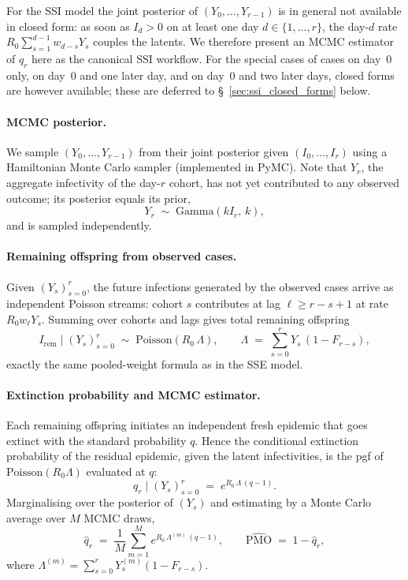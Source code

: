 \documentclass{article}
\theoremstyle{definition}
\begin{document}
For the SSI model the joint posterior of $(Y_0,\ldots,Y_{r-1})$ is in
general not available in closed form: as soon as $I_d > 0$ on at least
one day $d \in \{1, \ldots, r\}$, the day-$d$ rate
$R_0 \sum_{s=1}^{d-1} w_{d-s} Y_s$ couples the latents.  We therefore
present an MCMC estimator of $q_r$ here as the canonical SSI workflow.
For the special cases of cases on day~$0$ only, on day~$0$ and one
later day, and on day~$0$ and two later days, closed forms are however
available; these are deferred to \S~\ref{sec:ssi_closed_forms} below.

\paragraph{MCMC posterior.}

We sample $(Y_0,\ldots,Y_{r-1})$ from their joint posterior given
$(I_0,\ldots,I_r)$ using a Hamiltonian Monte Carlo sampler (implemented in
PyMC).  Note that $Y_r$, the aggregate infectivity of the day-$r$ cohort,
has not yet contributed to any observed outcome; its posterior equals its
prior,
\[
  Y_r \;\sim\; \mathrm{Gamma}(kI_r,\, k),
\]
and is sampled independently.

\paragraph{Remaining offspring from observed cases.}

Given $(Y_s)_{s=0}^r$, the future infections generated by the observed cases
arrive as independent Poisson streams: cohort $s$ contributes at lag
$\ell \geq r - s + 1$ at rate $R_0 w_\ell Y_s$.  Summing over cohorts and
lags gives total remaining offspring
\begin{equation}
  I_{\mathrm{rem}} \mid (Y_s)_{s=0}^r
  \;\sim\;
  \mathrm{Poisson}\!\left(R_0\,\Lambda\right),
  \qquad
  \Lambda \;=\; \sum_{s=0}^r Y_s\,(1-F_{r-s}),
\end{equation}
exactly the same pooled-weight formula as in the SSE model.

\paragraph{Extinction probability and MCMC estimator.}

Each remaining offspring initiates an independent fresh epidemic that goes
extinct with the standard probability $q$.  Hence the conditional extinction
probability of the residual epidemic, given the latent infectivities, is the
pgf of $\mathrm{Poisson}(R_0\Lambda)$ evaluated at $q$:
\begin{equation}
  q_r \mid (Y_s)_{s=0}^r \;=\; e^{R_0\,\Lambda\,(q-1)}.
\end{equation}
Marginalising over the posterior of $(Y_s)$ and estimating by a Monte Carlo
average over $M$ MCMC draws,
\begin{equation}
  \hat{q}_r \;=\; \frac{1}{M}\sum_{m=1}^{M} e^{R_0\,\Lambda^{(m)}\,(q-1)},
  \qquad
  \widehat{\mathrm{PMO}} \;=\; 1 - \hat{q}_r,
\end{equation}
where $\Lambda^{(m)} = \sum_{s=0}^r Y_s^{(m)}(1-F_{r-s})$.
\end{document}
